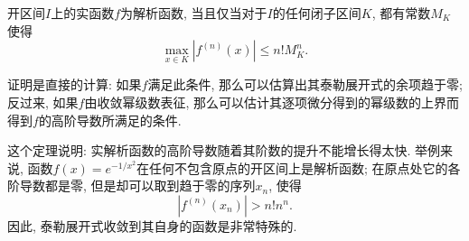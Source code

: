\begin{theorem}{}
开区间$I$上的实函数$f$为解析函数, 当且仅当对于$I$的任何闭子区间$K$, 都有常数$M_K$使得
$$
\max_{x\in K}|f^{(n)}(x)|\leq n!M_K^n.
$$
\end{theorem}

证明是直接的计算: 如果$f$满足此条件, 那么可以估算出其泰勒展开式的余项趋于零; 反过来, 如果$f$由收敛幂级数表征, 那么可以估计其逐项微分得到的幂级数的上界而得到$f$的高阶导数所满足的条件.

这个定理说明: 实解析函数的高阶导数随着其阶数的提升不能增长得太快. 举例来说, 函数$f(x)=e^{-1/x^2}$在任何不包含原点的开区间上是解析函数; 在原点处它的各阶导数都是零, 但是却可以取到趋于零的序列$x_n$, 使得
$$
|f^{(n)}(x_n)|>n!n^n.
$$
因此, 泰勒展开式收敛到其自身的函数是非常特殊的.